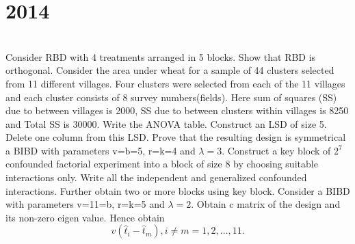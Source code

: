 \section*{2014}
\vspace{-.5cm}
\hrulefill \smallskip\\
 Consider RBD with 4 treatments arranged in 5 blocks. Show that RBD is orthogonal.
\myline
{} Consider the area under wheat for a sample of 44 clusters selected from 11 different villages. Four clusters were selected from each of the 11 villages and each cluster consists of 8 survey numbers(fields). Here sum of squares (SS) due to between villages is 2000, SS due to between clusters within villages is 8250 and Total SS is 30000. Write the ANOVA table.
\myline
{} Construct an LSD of size 5. Delete one column from this LSD. Prove that the resulting design is symmetrical a BIBD with parameters v=b=5, r=k=4 and $\lambda=3$.
\myline
{} Construct a key block of $2^7$ confounded factorial experiment into a block of size 8 by choosing suitable interactions only. Write all the independent and generalized confounded interactions. Further obtain two or more blocks using key block.
\myline
{} Consider a BIBD with parameters v=11=b, r=k=5 and $\lambda=2$. Obtain c matrix of the design and its non-zero eigen value. Hence obtain
\[v(\hat{t}_i - \hat{t}_m), i\neq m = 1,2,\ldots,11. \] 